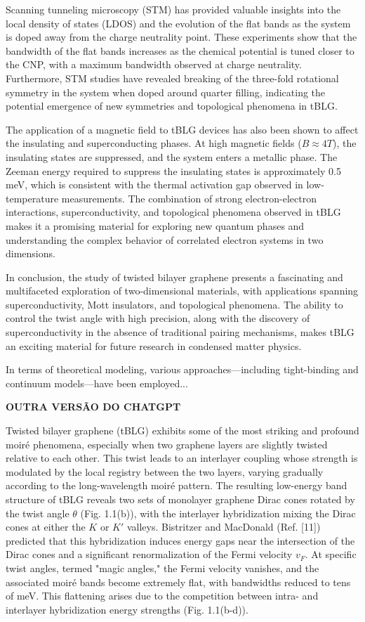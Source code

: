 Scanning tunneling microscopy (STM) has provided valuable insights into the local density of states (LDOS) and the evolution of the flat bands as the system is doped away from the charge neutrality point. These experiments show that the bandwidth of the flat bands increases as the chemical potential is tuned closer to the CNP, with a maximum bandwidth observed at charge neutrality. Furthermore, STM studies have revealed breaking of the three-fold rotational symmetry in the system when doped around quarter filling, indicating the potential emergence of new symmetries and topological phenomena in tBLG.

The application of a magnetic field to tBLG devices has also been shown to affect the insulating and superconducting phases. At high magnetic fields (\(B \approx 4T\)), the insulating states are suppressed, and the system enters a metallic phase. The Zeeman energy required to suppress the insulating states is approximately 0.5 meV, which is consistent with the thermal activation gap observed in low-temperature measurements. The combination of strong electron-electron interactions, superconductivity, and topological phenomena observed in tBLG makes it a promising material for exploring new quantum phases and understanding the complex behavior of correlated electron systems in two dimensions.

In conclusion, the study of twisted bilayer graphene presents a fascinating and multifaceted exploration of two-dimensional materials, with applications spanning superconductivity, Mott insulators, and topological phenomena. The ability to control the twist angle with high precision, along with the discovery of superconductivity in the absence of traditional pairing mechanisms, makes tBLG an exciting material for future research in condensed matter physics.

In terms of theoretical modeling, various approaches—including tight-binding and continuum models—have been employed...

\n
\textbf{OUTRA VERSÃO DO CHATGPT}
\n

Twisted bilayer graphene (tBLG) exhibits some of the most striking and profound moiré phenomena, especially when two graphene layers are slightly twisted relative to each other. This twist leads to an interlayer coupling whose strength is modulated by the local registry between the two layers, varying gradually according to the long-wavelength moiré pattern. The resulting low-energy band structure of tBLG reveals two sets of monolayer graphene Dirac cones rotated by the twist angle \(\theta\) (Fig. 1.1(b)), with the interlayer hybridization mixing the Dirac cones at either the \(K\) or \(K'\) valleys. Bistritzer and MacDonald (Ref. [11]) predicted that this hybridization induces energy gaps near the intersection of the Dirac cones and a significant renormalization of the Fermi velocity \(v_F\). At specific twist angles, termed "magic angles," the Fermi velocity vanishes, and the associated moiré bands become extremely flat, with bandwidths reduced to tens of meV. This flattening arises due to the competition between intra- and interlayer hybridization energy strengths (Fig. 1.1(b-d)).

